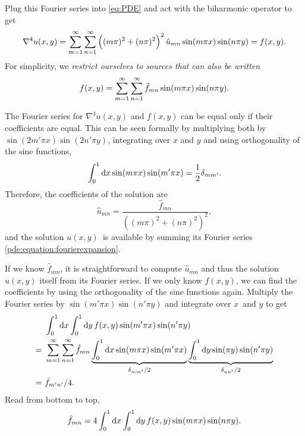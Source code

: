 Plug this Fourier series into \cref{eq:PDE} and act with the biharmonic operator to get
\begin{equation*}
\nabla^4 u(x,y) = \sum_{m=1}^{\infty} \sum_{n=1}^{\infty} \left((m\pi)^2+(n\pi)^2\right)^2 \hat{u}_{mn} \sin(m \pi x) \sin(n \pi y) = f(x,y).
\end{equation*}
For simplicity, we \emph{restrict ourselves to sources that can also be written}
\begin{equation}
	f(x,y) = \sum_{m=1}^{\infty} \sum_{n=1}^{\infty} \hat{f}_{mn} \sin(m \pi x) \sin(n \pi y).
\end{equation}

The Fourier series for $\nabla^4 u(x,y)$ and $f(x,y)$ can be equal only if their coefficients are equal.
This can be seen formally by multiplying both by $\sin(2m'\pi x) \sin(2n'\pi y)$, integrating over $x$ and $y$ and using orthogonality of the sine functions,
\begin{equation*}
	\integral{\sin(m\pi x) \sin(m' \pi x)}{x}{0}{1} = \frac{1}{2} \delta_{mm'}.
\end{equation*}
Therefore, the coefficients of the solution are
\begin{equation}
	\hat{u}_{mn} = \frac{\hat{f}_{mn}}{\left((m\pi)^2+(n\pi)^2\right)^2},
\end{equation}
and the solution $u(x,y)$ is available by summing its Fourier series \ref{pde:equation:fourierexpansion}.

If we know $\hat{f}_{mn}$, it is straightforward to compute $\hat{u}_{mn}$ and thus the solution $u(x,y)$ itself from its Fourier series.
If we only know $f(x,y)$, we can find the coefficients by using the orthogonality of the sine functions again.
Multiply the Fourier series by $\sin(m' \pi x) \sin(n' \pi y)$ and integrate over $x$ and $y$ to get
\begin{equation*}
\begin{split}
  & \,\, \integraltwo{f(x,y) \sin(m' \pi x) \sin(n' \pi y)}{x}{y}{0}{1}{0}{1} \\
= & \,\, \sum_{m=1}^{\infty} \sum_{n=1}^{\infty} \hat{f}_{mn} \underbrace{\integral{\sin(m\pi x)\sin(m'\pi x)}{x}{0}{1}}_{\delta_{mm'}/2} \underbrace{\integral{\sin(\pi y)\sin(n'\pi y)}{y}{0}{1}}_{\delta_{nn'}/2} \\
= & \,\, \hat{f}_{m'n'} / 4.
\end{split}
\end{equation*}
Read from bottom to top,
\begin{equation}
\hat{f}_{mn} = 4 \integraltwo{f(x,y) \sin(m \pi x) \sin(n \pi y)}{x}{y}{0}{1}{0}{1}.
\end{equation}

